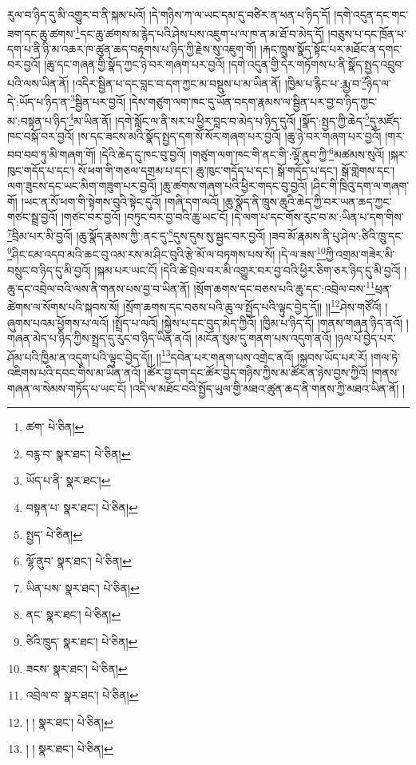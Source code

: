 རུལ་བ་ཉིད་དུ་མི་འགྱུར་བ་ནི་སྐམ་པའོ། །དེ་གཉིས་ཀ་ལ་ཡང་དམ་དུ་བཙིར་ན་ཕན་པ་ཉིད་དོ། །དགེ་འདུན་དང་གང་ཟག་དང་ཆུ་ཚགས་\footnote{ཚག་  པེ་ཅིན། }དང་ཆུ་ཚགས་མ་རྙེད་པའི་ཤེས་པས་འཇུག་པ་ལ་ཁ་ན་མ་ཐོ་བ་མེད་དོ། །བཅུས་པ་དང་ཁྲོན་པ་དག་པ་ནི་ཉི་མ་འཆར་ཁ་ཚུན་ཆད་བརྟགས་པ་ཉིད་ཀྱི་རྗེས་སུ་འཇུག་གོ། །རྐང་ཁྲུས་སྣོད་སྟོང་པར་མཐོང་ན་དགང་བར་བྱའོ། །ཆུ་དང་གཞན་གྱི་སྣོད་ཀྱང་ཉེ་བར་གཞག་པར་བྱའོ། །དགེ་འདུན་གྱི་དེར་གཏོགས་པ་ནི་སྣོད་སྤྱད་འབྲུབ་པའི་ལས་ཡིན་ནོ། །འདིར་སྦྱིན་པ་དང་བླང་བ་དག་ཀྱང་མ་བསྡུས་པ་མ་ཡིན་ནོ། །ཁྱིམ་པ་རྙིང་པ་:རྨྱ་བ་\footnote{བརྙ་བ་  སྣར་ཐང་།  པེ་ཅིན། }ཉིད་ལ་དེ་:ཡོད་པ་ཉིད་ན་\footnote{ཡོད་པ་ནི་  སྣར་ཐང་། }སྦྱིན་པར་བྱའོ། །དེས་གཙུག་ལག་ཁང་དུ་ཡོན་བདག་རྣམས་ལ་སྦྱིན་པར་བྱ་བ་ཉིད་ཀྱང་མ་:བསྟན་པ་ཉིད་\footnote{བསྟན་པ་  སྣར་ཐང་།  པེ་ཅིན། }མ་ཡིན་ནོ། །དགེ་སློང་ལ་ནི་སར་པ་ཕྱིར་བླང་བ་མེད་པ་ཉིད་དུའོ། །སྣོད་:སྤྱད་ཀྱི་ཆེད་\footnote{སྤྱད་  པེ་ཅིན། }དུ་མཛོད་ཁང་བསྐོ་བར་བྱའོ། །ས་དང་ཟངས་མའི་སྣོད་སྤྱད་དག་སོ་སོར་གཞག་པར་བྱའོ། །ཆུ་ཉེ་བར་གཞག་པར་བྱའོ། །གར་བབ་བབ་ཏུ་མི་གཞག་གོ། །དེའི་ཆེད་དུ་ཁང་བུ་བྱའོ། །གཙུག་ལག་ཁང་གི་ནང་གི་:ལྷོ་ནུབ་ཀྱི་\footnote{ལྷོ་ནུབ་  སྣར་ཐང་།  པེ་ཅིན། }མཚམས་སུའོ། །སྐར་ཁུང་གདོད་པ་དང་། སོ་ཕག་གི་གཅལ་དགྲམ་པ་དང་། ཆུ་ཁུང་གདོད་པ་དང་། སྒོ་གདོད་པ་དང་། སྒོ་གླེགས་དང་། ལག་ཟུངས་དང་ཡང་མིག་གཟུག་པར་བྱའོ། །ཆུ་ཚགས་གཞག་པའི་ཕྱིར་གདང་བུ་བྱའོ། །ཤིང་གི་ཁྲིའུ་དག་ལ་གཞག་གོ། །ཡང་ན་སོ་ཕག་གི་སྟེགས་བུའི་སྟེང་དུའོ། །གཞི་དག་ལའོ། །ཆུ་སྣོད་ནི་ཁྲུས་ཆུའི་ཆེད་ཀྱི་བར་ཡན་ཆད་ཀྱང་གཙང་སྦྲ་བྱའོ། །གཙང་བར་བྱའོ། །བཏུང་བར་བྱ་བའི་ཆུ་ཡང་ངོ། །དེ་ལག་པ་དང་གོས་རུང་བ་མ་:ཡིན་པ་དག་གིས་\footnote{ཡིན་པས་  སྣར་ཐང་།  པེ་ཅིན། }བྲིམ་པར་མི་བྱའོ། །ཆུ་སྣོད་རྣམས་ཀྱི་:ནང་དུ་\footnote{ནང་  སྣར་ཐང་།  པེ་ཅིན། }དུས་དུས་སུ་སྦྱང་བར་བྱའོ། །ཟབ་མོ་རྣམས་ནི་པུ་ཤེལ་:ཙིའི་ཁྲུ་དང་\footnote{ཙིའི་ཁྲུད་  སྣར་ཐང་།  པེ་ཅིན། }ཤིང་ངམ་འདབ་མའི་ཆང་བུ་འམ་རས་མ་ཤིང་བུའི་རྩེ་མོ་ལ་བཏགས་པས་སོ། །དེ་ལ་ཟས་\footnote{ཟངས་  སྣར་ཐང་།  པེ་ཅིན། }ཀྱི་འགྲམ་གཟེར་མི་བསྲུང་བ་ཉིད་དུ་མི་བྱའོ། །སྐམ་པར་ཡང་ངོ། །དེའི་ཚེ་བྲེལ་བར་མི་འགྱུར་བར་བྱ་བའི་ཕྱིར་ཅིག་ཅར་ཉིད་དུ་མི་བྱའོ། །ཆུ་དང་འབྲེལ་བའི་ལས་ནི་གནས་པས་བྱ་བ་ཡིན་ནོ། །སྲོག་ཆགས་དང་བཅས་པའི་ཆུ་དང་:འབྲེལ་བས་\footnote{འབྲེལ་བ་  སྣར་ཐང་།  པེ་ཅིན། }ཕྲན་ཚེགས་ལ་སོགས་པའི་སྐབས་སོ། །སྲོག་ཆགས་དང་བཅས་པའི་ཆུ་ལ་སྤྱོད་པའི་ལྟུང་བྱེད་དོ།། །།\footnote{། །  སྣར་ཐང་།  པེ་ཅིན། }ཤེས་གཙོའོ། །ཞུགས་པའམ་ཕྱོགས་པ་ལའོ། །སྤྲོད་པ་ལའོ། །སྐྱེས་པ་དང་བུད་མེད་ཀྱིའོ། །ཁྱིམ་པ་ཉིད་དོ། །གནས་གཞན་ཉིད་ནའོ། །གཞན་མེད་པ་ཉིད་ཀྱིས་སྤྲད་དུ་རུང་བ་ཉིད་ཡིན་ནའོ། །མངོན་སུམ་དུ་གནག་པས་འདུག་ནའོ། །ཉལ་པོ་བྱེད་པར་ཤོམ་པའི་ཁྱིམ་ན་འདུག་པའི་ལྟུང་བྱེད་དོ།། །།\footnote{། །  སྣར་ཐང་།  པེ་ཅིན། }དབེན་པར་གནག་པས་འགྲེང་ནའོ། །སྐྱབས་ཡོད་པར་རོ། །གལ་ཏེ་འཇིགས་པའི་དབང་གིས་མ་ཡིན་ནའོ། །ཚོར་བྱ་དག་དང་ཚོར་བྱེད་གཉིས་ཀྱིས་མ་ཚོར་ན་ཉེས་བྱས་ཀྱིའོ། །གནས་གཞན་ལ་སེམས་གཏོད་པ་ཡང་ངོ། །འདི་ལ་མཐོང་བའི་སྤྱོད་ཡུལ་གྱི་མཐའ་ཚུན་ཆད་ནི་གནས་ཀྱི་མཐའ་ཡིན་ནོ། །
